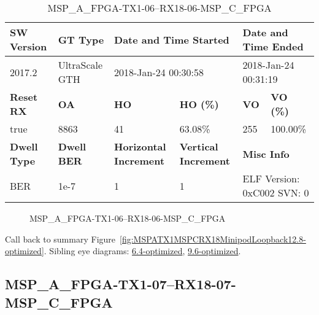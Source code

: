 \begin{table}[h]
\centering
\caption{MSP\_A\_FPGA-TX1-06--RX18-06-MSP\_C\_FPGA}
\label{tab:MSPAFPGATX106RX1806MSPCFPGA12.8-optimized}
\begin{tabular}{@{}|l|l|l|l|l|l|@{}}
\toprule
\textbf{SW Version}                & \textbf{GT Type}   & \multicolumn{2}{l|}{\textbf{Date and Time Started}}            & \multicolumn{2}{l|}{\textbf{Date and Time Ended}}        \\ \midrule
2017.2                       & UltraScale GTH          & \multicolumn{2}{l|}{2018-Jan-24 00:30:58}                   & \multicolumn{2}{l|}{2018-Jan-24 00:31:19}               \\ \midrule
\textbf{Reset RX}                  & \textbf{OA} & \textbf{HO}   & \textbf{HO (\%)} & \textbf{VO} & \textbf{VO (\%)} \\ \midrule
true & 8863        & 41          & 63.08\%        & 255        & 100.00\%       \\ \midrule
\textbf{Dwell Type}                & \textbf{Dwell BER} & \textbf{Horizontal Increment} & \textbf{Vertical Increment}    & \multicolumn{2}{l|}{\textbf{Misc Info}}                  \\ \midrule
BER                            & 1e-7        & 1        & 1           & \multicolumn{2}{l|}{ELF Version: 0xC002 SVN: 0}                         \\ \bottomrule
\end{tabular}
\end{table}

\begin{figure}[h]
\caption{MSP\_A\_FPGA-TX1-06--RX18-06-MSP\_C\_FPGA} \label{fig:MSPAFPGATX106RX1806MSPCFPGA12.8-optimized}
\end{figure}

Call back to summary Figure~\ref{fig:MSPATX1MSPCRX18MinipodLoopback12.8-optimized}.
Sibling eye diagrams: \hyperref[sec:MSPAFPGATX106RX1806MSPCFPGA6.4-optimized]{6.4-optimized}, \hyperref[sec:MSPAFPGATX106RX1806MSPCFPGA9.6-optimized]{9.6-optimized}.

\clearpage
\newpage


\subsection{MSP\_A\_FPGA-TX1-07--RX18-07-MSP\_C\_FPGA}\label{sec:MSPAFPGATX107RX1807MSPCFPGA12.8-optimized}

